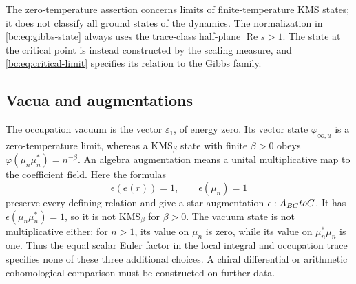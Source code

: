 The zero-temperature assertion concerns limits of finite-temperature
KMS states; it does not classify all ground states of the dynamics.
The normalization in \eqref{bc:eq:gibbs-state} always uses the
trace-class half-plane \(\operatorname{Re}s>1\). The state at the
critical point is instead constructed by the scaling measure, and
\eqref{bc:eq:critical-limit} specifies its relation to the Gibbs family.


\subsection{Vacua and augmentations}

The occupation vacuum is the vector \(\varepsilon_1\), of energy zero.
Its vector state \(\varphi_{\infty,u}\) is a zero-temperature limit,
whereas a KMS\(_\beta\) state with finite \(\beta>0\) obeys
\(\varphi(\mu_n\mu_n^*)=n^{-\beta}\).
An algebra augmentation means a unital multiplicative map to the
coefficient field. Here the formulas
\[
 \epsilon(e(r))=1,\qquad \epsilon(\mu_n)=1
\]
preserve every defining relation and give a star augmentation
\(\epsilon:A_{BC}toC\). It has
\(\epsilon(\mu_n\mu_n^*)=1\), so it is not KMS\(_\beta\) for
\(\beta>0\). The vacuum state is not multiplicative either: for
\(n>1\), its value on \(\mu_n\) is zero, while its value on
\(\mu_n^*\mu_n\) is one. Thus the equal scalar Euler factor in the
local integral and occupation trace specifies none of these three
additional choices. A chiral differential or arithmetic cohomological
comparison must be constructed on further data.
